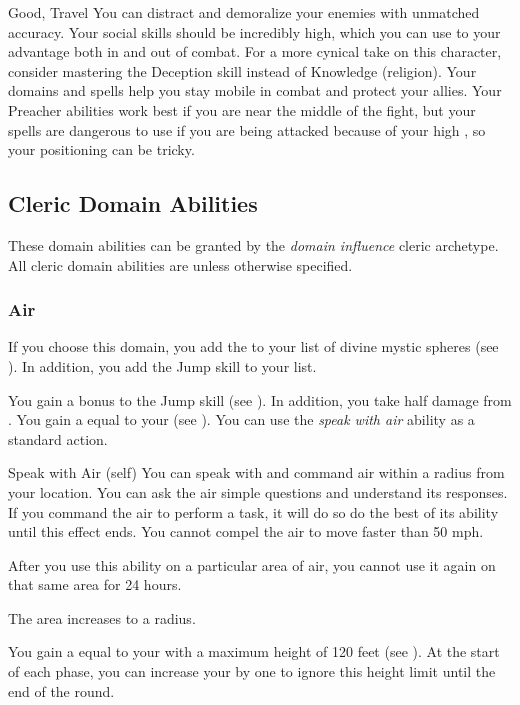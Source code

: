              Good, Travel
             You can distract and demoralize your enemies with unmatched accuracy.
            Your social skills should be incredibly high, which you can use to your advantage both in and out of combat.
            For a more cynical take on this character, consider mastering the Deception skill instead of Knowledge (religion).
            Your domains and spells help you stay mobile in combat and protect your allies.
            Your Preacher abilities work best if you are near the middle of the fight, but your spells are dangerous to use if you are being attacked because of your high , so your positioning can be tricky.

    \newpage
    \subsection{Cleric Domain Abilities}\label{Cleric Domain Abilities}
        These domain abilities can be granted by the \textit{domain influence} cleric archetype.
        All cleric domain abilities are  unless otherwise specified.

        \subsubsection{Air}
            If you choose this domain, you add the   to your list of divine mystic spheres (see ).
            In addition, you add the Jump skill to your  list.

             You gain a  bonus to the Jump skill (see ).
            In addition, you take half damage from .
             You gain a  equal to your  (see ).
             You can use the \textit{speak with air} ability as a standard action.
            \begin{attuneability}{Speak with Air}
                 (self)
                \rankline
                You can speak with and command air within a \areahuge radius  from your location.
                You can ask the air simple questions and understand its responses.
                If you command the air to perform a task, it will do so do the best of its ability until this effect ends.
                You cannot compel the air to move faster than 50 mph.

                After you use this ability on a particular area of air, you cannot use it again on that same area for 24 hours.

                \rankline
                 The area increases to a \areagarg radius.
            \end{attuneability}
             You gain a  equal to your  with a maximum height of 120 feet (see ).
            At the start of each phase, you can increase your  by one to ignore this height limit until the end of the round.

